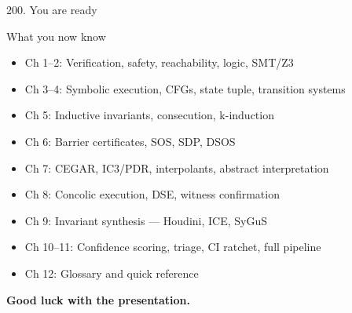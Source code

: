 \documentclass[aspectratio=169]{beamer}
\begin{document}
\begin{frame}{200. You are ready}
\begin{block}{What you now know}
\begin{itemize}
  \item Ch 1--2: Verification, safety, reachability, logic, SMT/Z3
  \item Ch 3--4: Symbolic execution, CFGs, state tuple, transition systems
  \item Ch 5: Inductive invariants, consecution, k-induction
  \item Ch 6: Barrier certificates, SOS, SDP, DSOS
  \item Ch 7: CEGAR, IC3/PDR, interpolants, abstract interpretation
  \item Ch 8: Concolic execution, DSE, witness confirmation
  \item Ch 9: Invariant synthesis --- Houdini, ICE, SyGuS
  \item Ch 10--11: Confidence scoring, triage, CI ratchet, full pipeline
  \item Ch 12: Glossary and quick reference
\end{itemize}
\end{block}
\begin{center}
\textbf{Good luck with the presentation.}
\end{center}
\end{frame}

\end{document}
